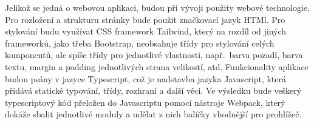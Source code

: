Jelikož se jedná o webovou aplikaci, budou při vývoji použity webové technologie. Pro rozložení a strukturu stránky bude použit značkovací jazyk HTMl. Pro stylování budu využívat CSS framework Tailwind, který na rozdíl od jiných frameworků, jako třeba Bootstrap, neobsahuje třídy pro stylování celých komponentů, ale spíše třídy pro jednotlivé vlastnosti, např.~barva pozadí, barva textu, margin a padding jednotlivých strana velikostí, atd. Funkcionality aplikace budou psány v jazyce Typescript, což je nadstavba jazyka Javascript, která přidává statické typování, třídy, rozhraní a další věci. Ve výsledku bude veškerý typescriptový kód přeložen do Javascriptu pomocí nástroje Webpack, který dokáže sbalit jednotlivé moduly a udělat z nich balíčky vhodnější pro prohlížeč.

\endinput